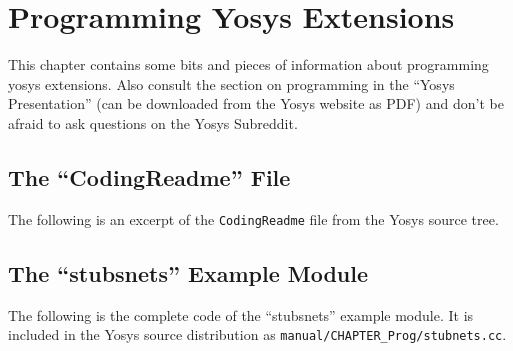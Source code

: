 
\chapter{Programming Yosys Extensions}
\label{chapter:prog}

This chapter contains some bits and pieces of information about programming
yosys extensions. Also consult the section on programming in the ``Yosys
Presentation'' (can be downloaded from the Yosys website as PDF) and don't
be afraid to ask questions on the Yosys Subreddit.

\section{The ``CodingReadme'' File}

The following is an excerpt of the {\tt CodingReadme} file from the Yosys source tree.



\section{The ``stubsnets'' Example Module}

The following is the complete code of the ``stubsnets'' example module. It is included in the Yosys source distribution as {\tt manual/CHAPTER\_Prog/stubnets.cc}.









